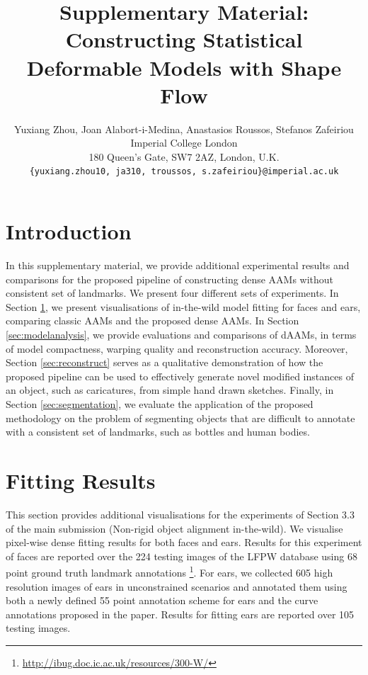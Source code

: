 






\title{Supplementary Material: Constructing Statistical Deformable Models with Shape Flow}

\author{Yuxiang Zhou, Joan Alabort-i-Medina, Anastasios Roussos, Stefanos Zafeiriou\\
Imperial College London\\
180 Queen’s Gate, SW7 2AZ, London, U.K.\\
{\tt\small \{yuxiang.zhou10, ja310, troussos, s.zafeiriou\}@imperial.ac.uk}}
\maketitle
\thispagestyle{empty}


\section*{Introduction}
In this supplementary material, we provide additional experimental results and comparisons for the proposed pipeline of constructing dense AAMs without consistent set of landmarks.
We present four different sets of experiments.
In Section \ref{sec:fittingresults}, we present visualisations of in-the-wild model fitting  for faces and ears, comparing classic AAMs and the proposed dense AAMs. In Section \ref{sec:modelanalysis}, we provide evaluations and comparisons of dAAMs, in terms of model compactness, warping quality and reconstruction accuracy.
Moreover, Section \ref{sec:reconstruct} serves as a qualitative demonstration of how the proposed pipeline can be used to effectively generate novel modified instances of an object, such as caricatures, from simple hand drawn sketches.
Finally, in Section \ref{sec:segmentation}, we evaluate the application of the proposed methodology on the problem of segmenting objects that are difficult to annotate with a consistent set of landmarks, such as bottles and human bodies.

\appendix
\section{Fitting Results}
\label{sec:fittingresults}

This section provides additional visualisations for the experiments of Section 3.3 of the main submission (Non-rigid object alignment in-the-wild). We visualise pixel-wise dense fitting results for both faces and ears. Results for this experiment of faces are reported over the 224 testing images of the LFPW database using 68 point ground truth landmark annotations
\footnote{\label{ibug_300} \url{http://ibug.doc.ic.ac.uk/resources/300-W/}}.
For ears, we collected 605 high resolution images of ears in unconstrained scenarios and annotated them using both a newly defined 55 point annotation scheme for ears and the curve annotations proposed in the paper. Results for fitting ears are reported over 105 testing images.


